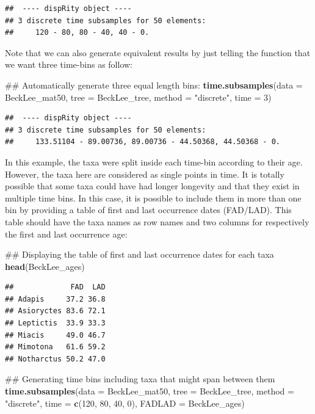 \documentclass[]{book}
\newenvironment{Shaded}{\begin{snugshade}}{\end{snugshade}}
\newcommand{\KeywordTok}[1]{\textcolor[rgb]{0.13,0.29,0.53}{\textbf{#1}}}
\newcommand{\DataTypeTok}[1]{\textcolor[rgb]{0.13,0.29,0.53}{#1}}
\newcommand{\DecValTok}[1]{\textcolor[rgb]{0.00,0.00,0.81}{#1}}
\newcommand{\StringTok}[1]{\textcolor[rgb]{0.31,0.60,0.02}{#1}}
\newcommand{\NormalTok}[1]{#1}
\theoremstyle{definition}
\theoremstyle{definition}
\theoremstyle{remark}
\begin{document}
\begin{verbatim}
##  ---- dispRity object ---- 
## 3 discrete time subsamples for 50 elements:
##     120 - 80, 80 - 40, 40 - 0.
\end{verbatim}

Note that we can also generate equivalent results by just telling the
function that we want three time-bins as follow:

\begin{Shaded}
\begin{Highlighting}[]
\NormalTok{## Automatically generate three equal length bins:}
\KeywordTok{time.subsamples}\NormalTok{(}\DataTypeTok{data =}\NormalTok{ BeckLee_mat50, }\DataTypeTok{tree =}\NormalTok{ BeckLee_tree, }\DataTypeTok{method =} \StringTok{"discrete"}\NormalTok{,}
                \DataTypeTok{time =} \DecValTok{3}\NormalTok{)}
\end{Highlighting}
\end{Shaded}

\begin{verbatim}
##  ---- dispRity object ---- 
## 3 discrete time subsamples for 50 elements:
##     133.51104 - 89.00736, 89.00736 - 44.50368, 44.50368 - 0.
\end{verbatim}

In this example, the taxa were split inside each time-bin according to
their age. However, the taxa here are considered as single points in
time. It is totally possible that some taxa could have had longer
longevity and that they exist in multiple time bins. In this case, it is
possible to include them in more than one bin by providing a table of
first and last occurrence dates (FAD/LAD). This table should have the
taxa names as row names and two columns for respectively the first and
last occurrence age:

\begin{Shaded}
\begin{Highlighting}[]
\NormalTok{## Displaying the table of first and last occurrence dates for each taxa}
\KeywordTok{head}\NormalTok{(BeckLee_ages)}
\end{Highlighting}
\end{Shaded}

\begin{verbatim}
##             FAD  LAD
## Adapis     37.2 36.8
## Asioryctes 83.6 72.1
## Leptictis  33.9 33.3
## Miacis     49.0 46.7
## Mimotona   61.6 59.2
## Notharctus 50.2 47.0
\end{verbatim}

\begin{Shaded}
\begin{Highlighting}[]
\NormalTok{## Generating time bins including taxa that might span between them}
\KeywordTok{time.subsamples}\NormalTok{(}\DataTypeTok{data =}\NormalTok{ BeckLee_mat50, }\DataTypeTok{tree =}\NormalTok{ BeckLee_tree, }\DataTypeTok{method =} \StringTok{"discrete"}\NormalTok{,}
                \DataTypeTok{time =} \KeywordTok{c}\NormalTok{(}\DecValTok{120}\NormalTok{, }\DecValTok{80}\NormalTok{, }\DecValTok{40}\NormalTok{, }\DecValTok{0}\NormalTok{), }\DataTypeTok{FADLAD =}\NormalTok{ BeckLee_ages)}
\end{Highlighting}
\end{Shaded}
\end{document}
